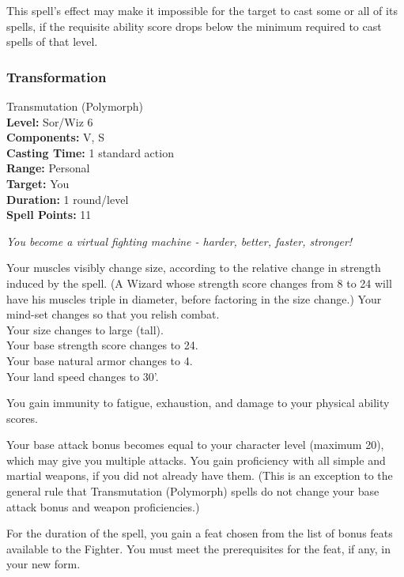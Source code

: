 This spell's effect may make it impossible for the target to cast some or all of its spells, 
if the requisite ability score drops below the minimum required to cast spells of that level.
\subsubsection{Transformation}
\label{Spell:Transformation}
Transmutation (Polymorph)
\\ \textbf{Level:} Sor/Wiz 6
\\ \textbf{Components:} V, S
\\ \textbf{Casting Time:} 1 standard action
\\ \textbf{Range:} Personal
\\ \textbf{Target:} You
\\ \textbf{Duration:} 1 round/level
\\ \textbf{Spell Points:} 11

\emph{You become a virtual fighting machine - harder, better, faster, stronger!} %

Your muscles visibly change size, according to the relative change in strength induced by the spell. 
(A Wizard whose strength score changes from 8 to 24 will have his muscles triple in diameter, before factoring in the size change.)
Your mind-set changes so that you relish combat.
\\ Your size changes to large (tall).
\\ Your base strength score changes to 24.
\\ Your base natural armor changes to 4.
\\ Your land speed changes to 30'.

You gain immunity to fatigue, exhaustion, and damage to your physical ability scores.

Your base attack bonus becomes equal to your character level (maximum 20), which may give you multiple attacks. 
You gain proficiency with all simple and martial weapons, if you did not already have them.
(This is an exception to the general rule that Transmutation (Polymorph) spells do not change your base attack bonus and weapon proficiencies.)

For the duration of the spell, you gain a feat chosen from the list of bonus feats available to the Fighter.
You must meet the prerequisites for the feat, if any, in your new form.

